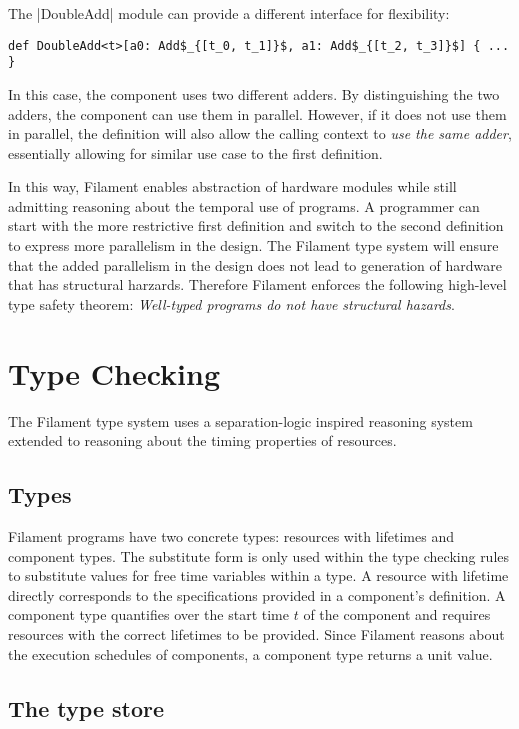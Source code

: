 \documentclass[acmsmall,review,anonymous]{acmart}
\begin{document}
The \code|DoubleAdd| module can provide a different interface for flexibility:
%
\begin{lstlisting}
def DoubleAdd<t>[a0: Add$_{[t_0, t_1]}$, a1: Add$_{[t_2, t_3]}$] { ... }
\end{lstlisting}
%
In this case, the component uses two different adders.
By distinguishing the two adders, the component can use them in parallel.
However, if it does not use them in parallel, the definition will also allow
the calling context to \emph{use the same adder}, essentially allowing for
similar use case to the first definition.

In this way, Filament enables abstraction of hardware modules while still
admitting reasoning about the temporal use of programs.
A programmer can start with the more restrictive first definition and switch to
the second definition to express more parallelism in the design.
The Filament type system will ensure that the added parallelism in the design
does not lead to generation of hardware that has structural harzards.
Therefore Filament enforces the following high-level type safety theorem:
\emph{Well-typed programs do not have structural hazards}.

\section{Type Checking}

The Filament type system uses a separation-logic inspired reasoning system
extended to reasoning about the timing properties of resources.

\subsection{Types}

Filament programs have two concrete types: resources with lifetimes and component
types.
The substitute form is only used within the type checking rules to substitute
values for free time variables within a type.
A resource with lifetime directly corresponds to the specifications provided
in a component's definition.
A component type quantifies over the start time $t$ of the component and requires
resources with the correct lifetimes to be provided.
Since Filament reasons about the execution schedules of components, a component
type returns a unit value.


\subsection{The type store}
\end{document}
